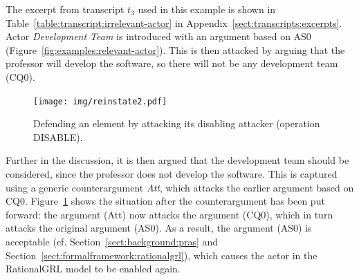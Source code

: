 The excerpt from transcript $t_3$ used in this example is shown in Table~\ref{table:transcript:irrelevant-actor} in Appendix~\ref{sect:transcripts:excerpts}. Actor \emph{Development Team} is introduced with an argument based on AS0 (Figure~\ref{fig:examples:relevant-actor}). This is then attacked by arguing that the professor will develop the software, so there will not be any development team (CQ0). 

\begin{figure}[b]
\centering
\texttt{[image: img/reinstate2.pdf]}
\caption{Defending an element by attacking its disabling attacker (operation \textsf{DISABLE)}.}
\label{fig:examples:relevant-actor2}
\end{figure}

Further in the discussion, it is then argued that the development team should be considered, since the professor does not develop the software. This is captured using a generic counterargument \emph{Att}, which attacks the earlier argument based on CQ0. Figure~\ref{fig:examples:relevant-actor2} shows the situation after the counterargument has been put forward: the argument (Att) now attacks the argument (CQ0), which in turn attacks the original argument (AS0). As a result, the argument (AS0) is acceptable (cf. Section~\ref{sect:background:pras} and Section~\ref{sect:formalframework:rationalgrl}), which causes the actor in the RationalGRL model to be enabled again.


